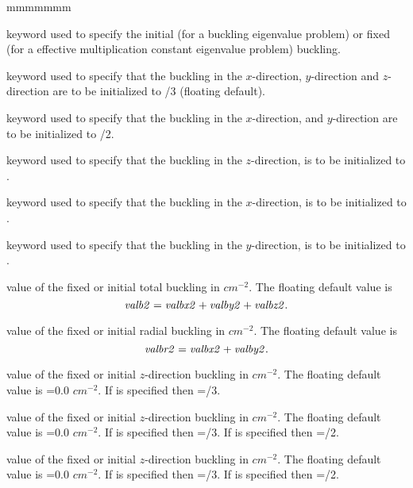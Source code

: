 \begin{ListeDeDescription}{mmmmmmm}
\item[\moc{BUCK}] keyword used to specify the initial (for a buckling
eigenvalue problem) or fixed (for a effective multiplication constant eigenvalue
problem) buckling. 

\item[\moc{G}] keyword used to specify that the buckling in the $x$-direction,
$y$-direction and $z$-direction are to be initialized to /3
(floating default).

\item[\moc{R}] keyword used to specify that the buckling in the $x$-direction,
and $y$-direction are to be initialized to /2.

\item[\moc{Z}] keyword used to specify that the buckling in the $z$-direction,
is to be initialized to .

\item[\moc{X}] keyword used to specify that the buckling in the $x$-direction,
is to be initialized to .

\item[\moc{Y}] keyword used to specify that the buckling in the $y$-direction,
is to be initialized to .

\item[\dusa{valb2}] value of the fixed or initial total buckling in $cm^{-2}$.
The floating default value is
$${\it valb2}={\it valbx2}+{\it valby2}+{\it valbz2}.$$

\item[\dusa{valbr2}] value of the fixed or initial radial buckling in
$cm^{-2}$. The floating default value is
$${\it valbr2}={\it valbx2}+{\it valby2}.$$

\item[\dusa{valbz2}] value of the fixed or initial $z$-direction buckling in
$cm^{-2}$. The floating default value is =0.0 $cm^{-2}$. If
 is specified then =/3.

\item[\dusa{valbx2}] value of the fixed or initial $z$-direction buckling in
$cm^{-2}$. The floating default value is =0.0 $cm^{-2}$. If
 is specified then =/3. If  is
specified then =/2.

\item[\dusa{valby2}] value of the fixed or initial $z$-direction buckling in
$cm^{-2}$. The floating default value is =0.0 $cm^{-2}$. If
 is specified then =/3. If  is
specified then =/2.


\end{ListeDeDescription}

